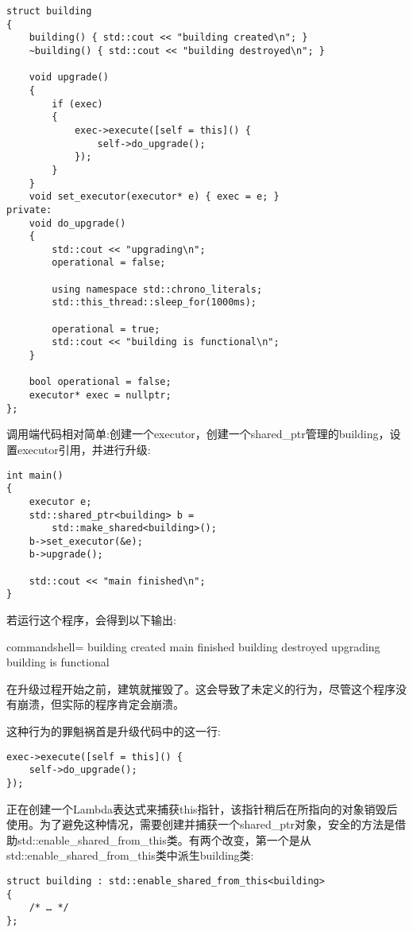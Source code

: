 \begin{lstlisting}[style=styleCXX]
struct building
{
	building() { std::cout << "building created\n"; }
	~building() { std::cout << "building destroyed\n"; }

	void upgrade()
	{
		if (exec)
		{
			exec->execute([self = this]() {
				self->do_upgrade();
			});
		}
	}
	void set_executor(executor* e) { exec = e; }
private:
	void do_upgrade()
	{
		std::cout << "upgrading\n";
		operational = false;

		using namespace std::chrono_literals;
		std::this_thread::sleep_for(1000ms);

		operational = true;
		std::cout << "building is functional\n";
	}

	bool operational = false;
	executor* exec = nullptr;
};
\end{lstlisting}

调用端代码相对简单:创建一个executor，创建一个shared\_ptr管理的building，设置executor引用，并进行升级:

\begin{lstlisting}[style=styleCXX]
int main()
{
	executor e;
	std::shared_ptr<building> b =
		std::make_shared<building>();
	b->set_executor(&e);
	b->upgrade();

	std::cout << "main finished\n";
}
\end{lstlisting}

若运行这个程序，会得到以下输出:

\begin{tcblisting}{commandshell={}}
building created
main finished
building destroyed
upgrading
building is functional
\end{tcblisting}

在升级过程开始之前，建筑就摧毁了。这会导致了未定义的行为，尽管这个程序没有崩溃，但实际的程序肯定会崩溃。

这种行为的罪魁祸首是升级代码中的这一行:

\begin{lstlisting}[style=styleCXX]
exec->execute([self = this]() {
	self->do_upgrade();
});
\end{lstlisting}

正在创建一个Lambda表达式来捕获this指针，该指针稍后在所指向的对象销毁后使用。为了避免这种情况，需要创建并捕获一个shared\_ptr对象，安全的方法是借助std::enable\_shared\_from\_this类。有两个改变，第一个是从std::enable\_shared\_from\_this类中派生building类:

\begin{lstlisting}[style=styleCXX]
struct building : std::enable_shared_from_this<building>
{
	/* … */
};
\end{lstlisting}

